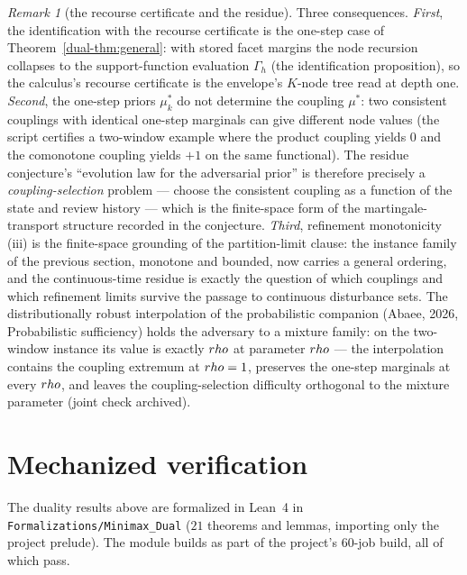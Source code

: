 \documentclass[10pt,twocolumn]{article}
\theoremstyle{plain}
\theoremstyle{definition}
\theoremstyle{remark}
\newtheorem{remark}[theorem]{Remark}
\begin{document}
\begin{remark}[the recourse certificate and the residue]\label{dual-rem:after-general}
Three consequences. \emph{First}, the identification with the recourse
certificate is the one-step case of Theorem~\ref{dual-thm:general}: with
stored facet margins the node recursion collapses to the
support-function evaluation $\Gamma_{h}$ (the identification
proposition), so the calculus's recourse
certificate is the envelope's $K$-node tree read at depth one.
\emph{Second}, the one-step priors $\mu^{*}_{k}$ do not determine the
coupling $\mu^{*}$: two consistent couplings with identical one-step
marginals can give different node values (the script certifies a
two-window example where the product coupling yields $0$ and the
comonotone coupling yields $+1$ on the same functional). The residue
conjecture's ``evolution law for the adversarial prior'' is therefore
precisely a \emph{coupling-selection} problem --- choose the consistent
coupling as a function of the state and review history --- which is the finite-space form of the martingale-transport structure recorded in the conjecture. \emph{Third}, refinement monotonicity (iii) is the
finite-space grounding of the partition-limit clause: the instance
family of the previous section, monotone and bounded, now carries a
general ordering, and the continuous-time residue is exactly the
question of which couplings and which refinement limits survive the
passage to continuous disturbance sets. The distributionally robust
interpolation of the probabilistic companion (Abaee, 2026, Probabilistic sufficiency) holds the
adversary to a mixture family: on the two-window instance its value is
exactly $\\rho$ at parameter $\\rho$ --- the interpolation contains the
coupling extremum at $\\rho = 1$, preserves the one-step marginals at
every $\\rho$, and leaves the coupling-selection difficulty orthogonal to
the mixture parameter (joint check archived).
\end{remark}

\section{Mechanized verification}

The duality results above are formalized in Lean~4 in \texttt{Formalizations/Minimax\_Dual} (\(21\) theorems and lemmas, importing only the
project prelude). The module builds as part of the project's \(60\)-job build, all of
which pass.
\end{document}
